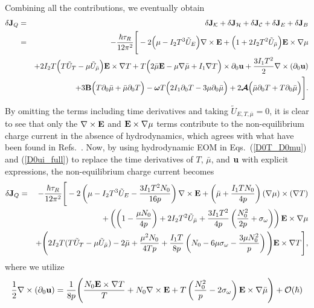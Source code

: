 \documentclass[aps,prd,showkeys,preprint,amsmath,amssymb,nofootinbib]{revtex4-1}
\begin{document}
Combining all the contributions, we eventually obtain 
\begin{eqnarray}\nonumber
\delta {\bf J}_Q&=&\delta {\bf J}_{\mathcal{K}}+\delta {\bf J}_{\mathcal{H}}+\delta {\bf J}_{\mathcal{C}}+\delta{\bf J}_E+\delta {\bf J}_B
\\\nonumber
&=&-\frac{\hbar\tau_R}{12\pi^2}\Bigg[-2\Big(\mu-I_2T^3\tilde{U}_{E}\Big)\nabla\times{\bf E}
+\Big(1+2I_2T^2\tilde{U}_{\bar{\mu}}\Big) {\bf E}\times\nabla\mu
\\\nonumber
&&+2I_2T\Big(T\tilde{U}_T-\mu\tilde{U}_{\bar{\mu}}\Big){\bf E}\times\nabla T
+T\Big(2\bar{\mu}{\bf E}-\mu\nabla\bar{\mu}+I_1\nabla T\Big)\times\partial_0{\bf u}
+\frac{3I_1T^2}{2}\nabla\times(\partial_0{\bf u})
\\
&&+3{\bf B}\Big(T\partial_0\bar{\mu}+\bar{\mu}\partial_0T\Big)
-\bm{\omega}T\Big(2I_1\partial_0T-3\mu\partial_0\bar{\mu}\Big)
+2\bm{\mathcal{A}}\Big(\bar{\mu}\partial_0T+T\partial_0\bar{\mu}\Big)
\Bigg].
\end{eqnarray}
By omitting the terms including time derivatives and taking $\tilde{U}_{E,T,\bar{\mu}}=0$,
it is clear to see that only the ${\bf\nabla\times E}$ and ${\bf E}\times\nabla\mu$ terms contribute to the non-equilibrium charge current in the absence of hydrodynamics, which agrees with what have been found in Refs.~\cite{Chen:2016xtg,Gorbar:2016qfh}. Now, by using hydrodynamic EOM in Eqs.~(\ref{D0T_D0mu}) and (\ref{D0ui_full}) to replace the time derivatives of $T$, $\bar{\mu}$, and ${\bf u}$ with explicit expressions, the non-equilibrium charge current becomes 
\begin{eqnarray}\nonumber\label{charge_J_hydro}
\delta {\bf J}_Q&=&-\frac{\hbar\tau_R}{12\pi^2}\Bigg[-2\left(\mu-I_2T^3\tilde{U}_{E}-\frac{3I_1T^2N_0}{16p}\right)\nabla\times{\bf E}+\left(\bar{\mu}+\frac{I_1TN_0}{4p}\right)(\nabla\mu)\times(\nabla T)
\\\nonumber
&&+\left(\left(1-\frac{\mu N_0}{4p}\right)
+2I_2T^2\tilde{U}_{\bar{\mu}}+\frac{3I_1T^2}{4p}\left(\frac{N_0^2}{2p}+\sigma_{\omega}\right)\right){\bf E}\times\nabla\mu
\\
&&
+\Bigg(2I_2T(T\tilde{U}_T-\mu\tilde{U}_{\bar{\mu}})-2\bar{\mu}
+\frac{\mu^2 N_0}{4Tp}
+\frac{I_1T}{8p}\left(N_0-6\mu\sigma_{\omega}-\frac{3\mu N_0^2}{p}\right)
\Bigg){\bf E}\times\nabla T
\Bigg],
\end{eqnarray}
where we utilize
\begin{eqnarray}
\frac{1}{2}\nabla\times(\partial_0{\bf u})
=\frac{1}{8p}
\Bigg(\frac{N_0{\bf E}\times\nabla T}{T}+N_0\nabla\times{\bf E}
+T\left(\frac{N_0^2}{p}-2\sigma_{\omega}\right){\bf E}\times\nabla\bar{\mu}\Bigg)+\mathcal{O}(\hbar)
\end{eqnarray}
\end{document}
